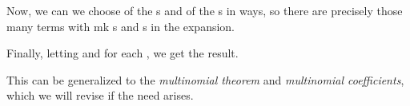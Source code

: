 
			Now, we can we choose  of the s and  of the s in  ways, so there are precisely those many terms with m{k} s and  s in the expansion.

			Finally, letting  and  for each , we get the result.
		\stopproof

		\startremark
			This can be generalized to the \emph{multinomial theorem} and \emph{multinomial coefficients}, which we will revise if the need arises.
		\stopremark

	\stopsection

\stopchapter
